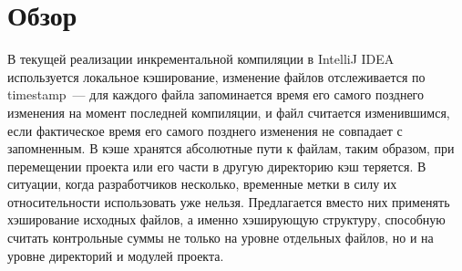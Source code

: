 \section{Обзор}

В текущей реализации инкрементальной компиляции в IntelliJ IDEA используется локальное кэширование, изменение файлов отслеживается по timestamp~--- для каждого файла запоминается время его самого позднего изменения на момент последней компиляции, и файл считается изменившимся, если фактическое время его самого позднего изменения не совпадает с запомненным. В кэше хранятся абсолютные пути к файлам, таким образом, при перемещении проекта или его части в другую директорию кэш теряется. В ситуации, когда разработчиков несколько, временные метки в силу их относительности использовать уже нельзя. Предлагается вместо них применять хэширование исходных файлов, а именно хэширующую структуру, способную считать контрольные суммы не только на уровне отдельных файлов, но и на уровне директорий и модулей проекта.